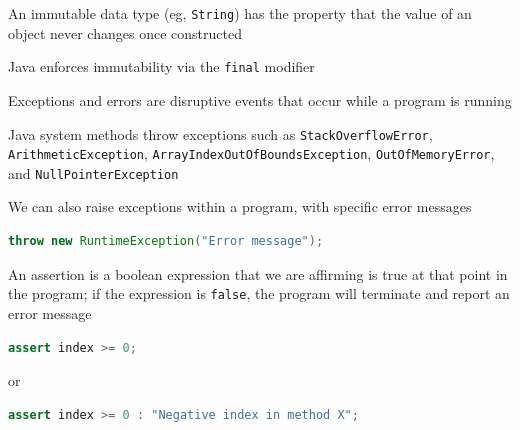 \documentclass[8pt,a4paper,compress]{beamer}
\begin{document}
\begin{frame}[fragile]
\pause

An immutable data type (eg, \lstinline{String}) has the property that the value of an object never changes once constructed

\pause
\bigskip

Java enforces immutability via the \lstinline{final} modifier

\pause
\bigskip

Exceptions and errors are disruptive events that occur while a program is running

\pause
\bigskip

Java system methods throw exceptions such as  \lstinline{StackOverflowError}, \lstinline{ArithmeticException}, \lstinline{ArrayIndexOutOfBoundsException}, \lstinline{OutOfMemoryError}, and \lstinline{NullPointerException}

\pause
\bigskip

We can also raise exceptions within a program, with specific error messages
\begin{lstlisting}[language=Java]
throw new RuntimeException("Error message");
\end{lstlisting}

\pause
\bigskip

An assertion is a boolean expression that we are affirming is true at that point in the program; if the expression is \lstinline{false}, the program will terminate and report an error message
\begin{lstlisting}[language=Java]
assert index >= 0;
\end{lstlisting}
or
\begin{lstlisting}[language=Java]
assert index >= 0 : "Negative index in method X";
\end{lstlisting}
\end{frame}
\end{document}
